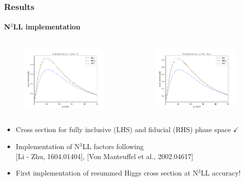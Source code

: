 \documentclass[aspectratio=43]{beamer}
\begin{document}
\begin{frame}
	
	\frametitle{Results}
	\framesubtitle{N$^{3}$LL implementation}
	
	\footnotesize
	
	\begin{columns}
		
		
		\begin{figure}
			\includegraphics[width = 6cm]{plots/part3/chapter7/hturbo_n3ll.png}
		\end{figure}
		
		
		\begin{figure}
			\includegraphics[width = 6cm]{plots/part3/chapter7/hturbo_n3ll_cuts.png}
		\end{figure}
		
	\end{columns}
	
	\begin{itemize}
		\item Cross section for fully inclusive (LHS) and fiducial (RHS) phase space {\color{darkgreen}$\checkmark$} 
		\item Implementation of N$^{3}$LL factors following \\
		{\color{blue}[Li - Zhu, 1604.01404]}, 
		{\color{blue}[Von Manteuffel et al., 2002.04617]}
		\item First implementation of resummed Higgs cross section at N$^{3}$LL accuracy!
	\end{itemize}

\end{frame}
\end{document}
